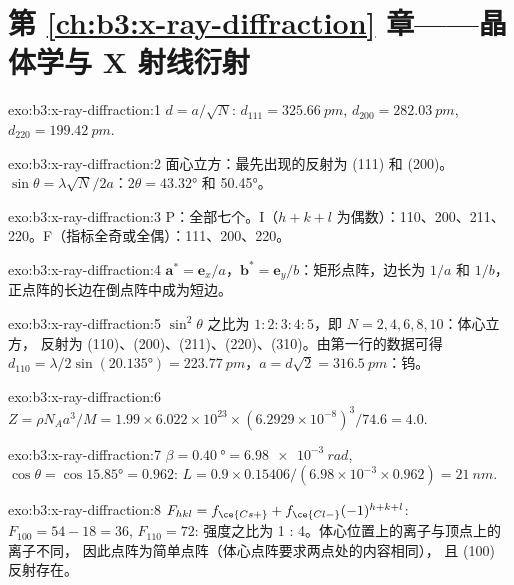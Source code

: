 \section*{第 \ref{ch:b3:x-ray-diffraction} 章——晶体学与 X 射线衍射}

\begin{solution}{exo:b3:x-ray-diffraction:1}
$d = a/\sqrt N$: $d_{111} = \qty{325.66}{pm}$, $d_{200} = \qty{282.03}{pm}$, $d_{220} =
\qty{199.42}{pm}$.
\end{solution}

\begin{solution}{exo:b3:x-ray-diffraction:2}
面心立方：最先出现的反射为 (111) 和 (200)。$\sin\theta = \lambda\sqrt N/2a$：$2\theta =
\ang{43.32}$ 和 \ang{50.45}。
\end{solution}

\begin{solution}{exo:b3:x-ray-diffraction:3}
P：全部七个。I（$h + k + l$ 为偶数）：110、200、211、220。F（指标全奇或全偶）：111、200、220。
\end{solution}

\begin{solution}{exo:b3:x-ray-diffraction:4}
$\mathbf a^* = \mathbf e_x/a$，$\mathbf b^* = \mathbf e_y/b$：矩形点阵，边长为 $1/a$
和 $1/b$，正点阵的长边在倒点阵中成为短边。
\end{solution}

\begin{solution}{exo:b3:x-ray-diffraction:5}
$\sin^2\theta$ 之比为 $1 : 2 : 3 : 4 : 5$，即 $N = 2, 4, 6, 8, 10$：体心立方，
反射为 (110)、(200)、(211)、(220)、(310)。由第一行的数据可得 $d_{110} = \lambda/2\sin(\ang{20.135}) =
\qty{223.77}{pm}$，$a = d\sqrt2 = \qty{316.5}{pm}$：钨。
\end{solution}

\begin{solution}{exo:b3:x-ray-diffraction:6}
$Z = \rho N_Aa^3/M = 1.99 \times 6.022\times10^{23} \times (6.2929\times10^{-8})^3/74.6 = 4.0$.
\end{solution}

\begin{solution}{exo:b3:x-ray-diffraction:7}
$\beta = \qty{0.40}{\degree} = \qty{6.98e-3}{rad}$, $\cos\theta = \cos\ang{15.85} = 0.962$:
$L = 0.9 \times 0.15406/(6.98\times10^{-3} \times 0.962) = \qty{21}{nm}$.
\end{solution}

\begin{solution}{exo:b3:x-ray-diffraction:8}
$F_{hkl} = f_{\ce{Cs+}} + f_{\ce{Cl-}}(-1)^{h+k+l}$: $F_{100} = 54 - 18 = 36$, $F_{110} = 72$:
强度之比为 1 : 4。体心位置上的离子与顶点上的离子不同，
因此点阵为简单点阵（体心点阵要求两点处的内容相同），
且 (100) 反射存在。
\end{solution}


